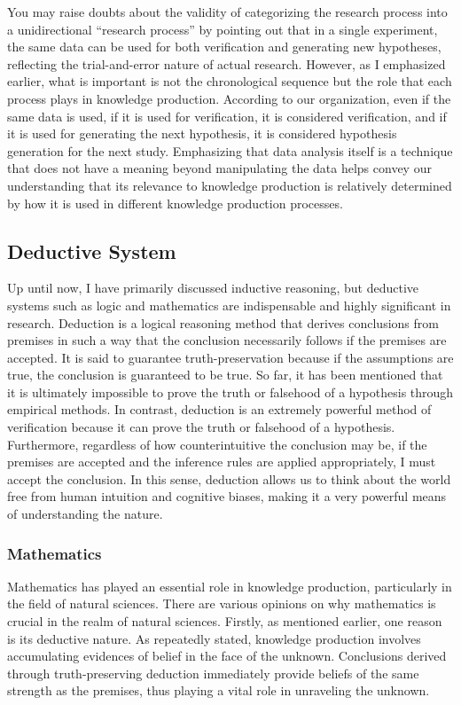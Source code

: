 \documentclass{book}
\begin{document}
You may raise doubts about the validity of categorizing the research process into a unidirectional ``research process'' by pointing out that in a single experiment, the same data can be used for both verification and generating new hypotheses, reflecting the trial-and-error nature of actual research. However, as I emphasized earlier, what is important is not the chronological sequence but the role that each process plays in knowledge production. According to our organization, even if the same data is used, if it is used for verification, it is considered verification, and if it is used for generating the next hypothesis, it is considered hypothesis generation for the next study. Emphasizing that data analysis itself is a technique that does not have a meaning beyond manipulating the data helps convey our understanding that its relevance to knowledge production is relatively determined by how it is used in different knowledge production processes.

\subsection{Deductive System}
Up until now, I have primarily discussed inductive reasoning, but deductive systems such as logic and mathematics are indispensable and highly significant in research. Deduction is a logical reasoning method that derives conclusions from premises in such a way that the conclusion necessarily follows if the premises are accepted. It is said to guarantee truth-preservation because if the assumptions are true, the conclusion is guaranteed to be true. So far, it has been mentioned that it is ultimately impossible to prove the truth or falsehood of a hypothesis through empirical methods. In contrast, deduction is an extremely powerful method of verification because it can prove the truth or falsehood of a hypothesis. Furthermore, regardless of how counterintuitive the conclusion may be, if the premises are accepted and the inference rules are applied appropriately, I must accept the conclusion. In this sense, deduction allows us to think about the world free from human intuition and cognitive biases, making it a very powerful means of understanding the nature.

\subsubsection{Mathematics}
Mathematics has played an essential role in knowledge production, particularly in the field of natural sciences. There are various opinions on why mathematics is crucial in the realm of natural sciences. Firstly, as mentioned earlier, one reason is its deductive nature. As repeatedly stated, knowledge production involves accumulating evidences of belief in the face of the unknown. Conclusions derived through truth-preserving deduction immediately provide beliefs of the same strength as the premises, thus playing a vital role in unraveling the unknown. 
\end{document}
